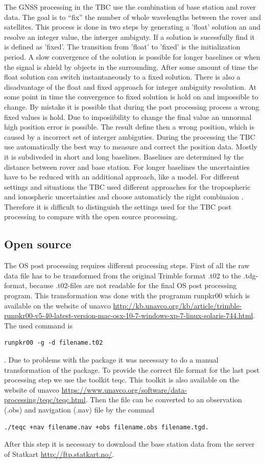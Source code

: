The GNSS processing in the TBC use the combination of base station and rover data.
The goal is to “fix” the number of whole wavelengths between the rover and satellites.
This process is done in two steps by generating a 'float' solution an and resolve an integer value, the interger ambiguty. 
If a solution is sucessfully find it is defined as 'fixed'.
The transition from 'float' to 'fixed' is the initialization period.
A slow convergence of the solution is possible for longer baselines or when the signal is shield by objects in the surrounding.
After some amount of time the float solution can switch instantaneously to a fixed solution.
There is also a disadvantage of the float and fixed approach for integer ambiguity resolution.
At some point in time the convergence to fixed solution is hold on and impossible to change.
By mistake it is possible that during the post processing process a wrong fixed values is hold. 
Due to imposiibility to change the final value an unnormal high position error is possible. 
The result define then a wrong position, which is caused by a incorrect set of interger ambiguties.
During the processing the TBC use automatically the best way to measure and correct the position data. 
Mostly it is subdiveded in short and long baselines.
Baselines are determined by the distance between rover and base station.
For longer baselines the uncertainties have to be reduced with an additional approach, like a model.
For different settings and situations the TBC used different approaches for the tropospheric and ionospheric uncertainties and choose automaticly the right combinaion \citep{Trprocess}.
Therefore it is difficult to distinguish the settings used for the TBC post processing to compare with the open source processing.

\subsection{Open source}
The OS post processing requires different processing steps.
First of all the raw data file has to be transformed from the original Trimble format .t02 to the .tdg-format, because .t02-files are not readable for the final OS post processing program.
This transformation was done with the programm runpkr00 which is available on the website of unavco \url{http://kb.unavco.org/kb/article/trimble-runpkr00-v5-40-latest-version-mac-osx-10-7-windows-xp-7-linux-solaris-744.html}.
The used command is 
\begin{verbatim} 
runpkr00 -g -d filename.t02 
\end{verbatim}.
Due to problems with the package it was necessary to do a manual transformation of the package.
To provide the correct file format for the last post processing step we use the toolkit teqc.
This toolkit is also available on the website of unavco \url{https://www.unavco.org/software/data-processing/teqc/teqc.html}.
Then the file can be converted to an observation (.obs) and navigation (.nav) file by the commad
\begin{verbatim}
./teqc +nav filename.nav +obs filename.obs filename.tgd.
\end{verbatim} 
After this step it is necessary to download the base station data from the server of Statkart \url{http://ftp.statkart.no/}.
\medskip

